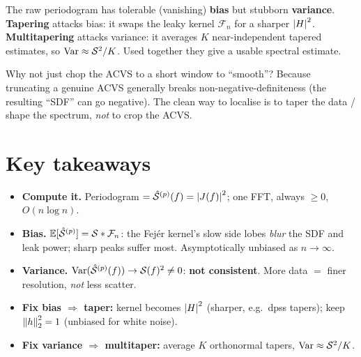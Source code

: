 \documentclass[11pt]{article}
\newcommand{\Fej}{\mathcal{F}}   %
\begin{document}
\begin{intu}
The raw periodogram has tolerable (vanishing) \textbf{bias} but stubborn \textbf{variance}. \textbf{Tapering} attacks bias: it swaps the leaky kernel $\Fej_n$ for a sharper $\left\lvert H \right\rvert^2$. \textbf{Multitapering} attacks variance: it averages $K$ near-independent tapered estimates, so $\operatorname{Var}\approx\mathcal{S}^2/K$. Used together they give a usable spectral estimate.
\end{intu}

\begin{intu}
Why not just chop the ACVS to a short window to ``smooth''? Because truncating a genuine ACVS generally breaks non-negative-definiteness (the resulting ``SDF'' can go negative). The clean way to localise is to taper the data / shape the spectrum, \emph{not} to crop the ACVS.
\end{intu}

\section*{Key takeaways}

\begin{retenir}
\begin{itemize}
  \item \textbf{Compute it.} Periodogram $=\hat{\mathcal{S}}^{(p)}(f)=\left\lvert J(f) \right\rvert^2$; one FFT, always $\ge0$, $O(n\log n)$.
  \item \textbf{Bias.} $\E[\hat\sdf^{(p)}]=\sdf*\Fej_n$: the Fej\'er kernel's slow side lobes \emph{blur} the SDF and leak power; sharp peaks suffer most. Asymptotically unbiased as $n\to\infty$.
  \item \textbf{Variance.} $\operatorname{Var}(\hat{\mathcal{S}}^{(p)}(f))\to\mathcal{S}(f)^2\ne0$: \textbf{not consistent}. More data $=$ finer resolution, \emph{not} less scatter.
  \item \textbf{Fix bias $\Rightarrow$ taper:} kernel becomes $\left\lvert H \right\rvert^2$ (sharper, e.g.\ dpss tapers); keep $\left\lVert h \right\rVert_2^2=1$ (unbiased for white noise).
  \item \textbf{Fix variance $\Rightarrow$ multitaper:} average $K$ orthonormal tapers, $\operatorname{Var}\approx\mathcal{S}^2/K$.
\end{itemize}
\end{retenir}
\end{document}
